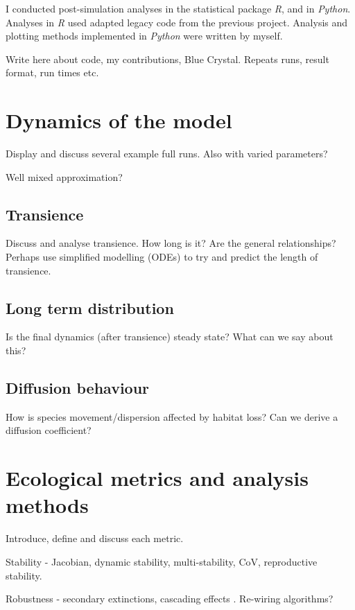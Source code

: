I conducted post-simulation analyses in the statistical package \emph{R}, and in \emph{Python}. Analyses in \emph{R} used adapted legacy code from the previous project. Analysis and plotting methods implemented in \emph{Python} were written by myself.

Write here about code, my contributions, Blue Crystal. Repeats runs, result format, run times etc.

\section{Dynamics of the model}
\label{sec:dynamics_results}

Display and discuss several example full runs. Also with varied parameters?

Well mixed approximation?

\subsection{Transience}

Discuss and analyse transience. How long is it? Are the general relationships? Perhaps use simplified modelling (ODEs) to try and predict the length of transience.

\subsection{Long term distribution}

Is the final dynamics (after transience) steady state? What can we say about this?

\subsection{Diffusion behaviour}

How is species movement/dispersion affected by habitat loss? Can we derive a diffusion coefficient?

\section{Ecological metrics and analysis methods}
\label{sec:metrics_explained}

Introduce, define and discuss each metric.

Stability - Jacobian, dynamic stability, multi-stability, CoV, reproductive stability. 

Robustness - secondary extinctions, cascading effects \cite{evans2013robustness}. Re-wiring algorithms?

